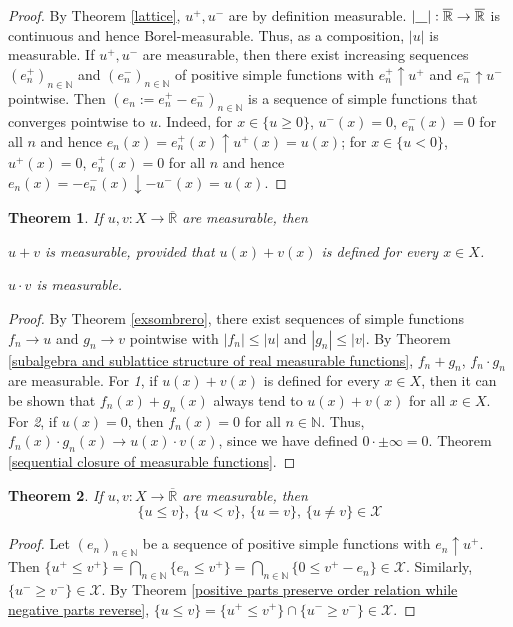 \documentclass[11pt, a4paper, openany]{book}
\newtheorem{thm}{Theorem}\newtheorem{lem}{Lemma}\newtheorem{crl}{Corollary}
\theoremstyle{definition}
\newcommand{\ph}{\underline{\hspace{0.3cm}}}
\newcommand{\er}{\overline{\mathbb{R}}}
\newenvironment{tight_enumerate}{\begin{enumerate}\itemsep -0.2em}{\end{enumerate}}
\begin{document}
    \begin{proof}
        By Theorem \ref{lattice}, $u^+,u^-$ are by definition measurable. $|\ph|:\er\rightarrow \er$ is continuous and hence Borel-measurable. Thus, as a composition, $|u|$ is measurable. If $u^+,u^-$ are measurable, then there exist increasing sequences $(e_n^+)_{n\in\mathbb{N}}$ and $(e_n^-)_{n\in\mathbb{N}}$ of positive simple functions with $e_n^+\uparrow u^+$ and $e_n^-\uparrow u^-$ pointwise. Then $(e_n:=e_n^+-e_n^-)_{n\in\mathbb{N}}$ is a sequence of simple functions that converges pointwise to $u$. Indeed, for $x\in \{u\geqslant 0\}$, $u^-(x)=0$, $e_n^-(x)=0$ for all $n$ and hence $e_n(x)=e_n^+(x)\uparrow u^+(x)=u(x)$; for $x\in \{u< 0\}$, $u^+(x)=0$, $e_n^+(x)=0$ for all $n$ and hence $e_n(x)=-e_n^-(x)\downarrow -u^-(x)=u(x)$.
    \end{proof}
    \begin{thm}
        If $u,v:X\rightarrow \er$ are measurable, then
        \begin{tight_enumerate}
            \item $u+v$ is measurable, provided that $u(x)+v(x)$ is defined for every $x\in X$.
            \item $u\cdot v$ is measurable.
        \end{tight_enumerate} 
    \end{thm}
    \begin{proof}
        By Theorem \ref{exsombrero}, there exist sequences of simple functions $f_n\to u$ and $g_n\to v$ pointwise with $|f_n|\leqslant |u|$ and $|g_n|\leqslant |v|$. By Theorem \ref{subalgebra and sublattice structure of real measurable functions}, $f_n+g_n$, $f_n\cdot g_n$ are measurable. For \textit{1}, if $u(x)+v(x)$ is defined for every $x\in X$, then it can be shown that $f_n(x)+g_n(x)$ always tend to $u(x)+v(x)$ for all $x\in X$. For \textit{2}, if $u(x)=0$, then $f_n(x)=0$ for all $n\in\mathbb{N}$. Thus, $f_n(x)\cdot g_n(x)\to u(x)\cdot v(x)$, since we have defined  $0\cdot \pm\infty=0$. Theorem \ref{sequential closure of measurable functions}.
    \end{proof}
    \begin{thm}
        If $u,v:X\rightarrow \er$ are measurable, then
        \[
            \{u\leqslant v\},\,\{u<v\},\,\{u=v\},\,\{u\neq v\}\in\mathscr{X}
        \]
    \end{thm}
    \begin{proof}
        Let $(e_n)_{n\in\mathbb{N}}$ be a sequence of positive simple functions with $e_n\uparrow u^+$. Then $\{u^+\leqslant v^+\}=\bigcap_{n\in\mathbb{N}}\{e_n\leqslant v^+\}=\bigcap_{n\in\mathbb{N}}\{0\leqslant v^+-e_n\}\in\mathscr{X}$. Similarly, $\{u^-\geqslant v^-\}\in\mathscr{X}$. By Theorem \ref{positive parts preserve order relation while negative parts reverse}, $\{u\leqslant v\}=\{u^+\leqslant v^+\}\cap \{u^-\geqslant v^-\}\in\mathscr{X}$.
    \end{proof}
\end{document}
